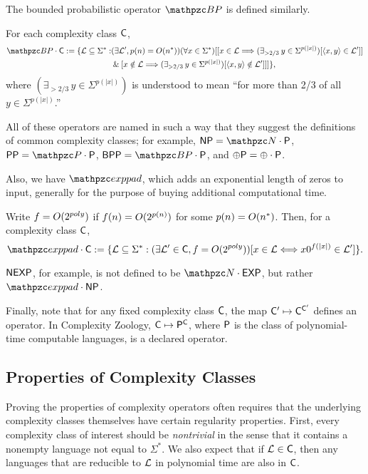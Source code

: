 The bounded probabilistic operator $\cBP$ is defined similarly.
\begin{definition}
For each complexity class $\mathsf{C}$,
\begin{align*}
\cBP\cdot\sC:=\{\cL\subseteq\Sigma^*:&(\exists\cL^\prime,p(n)=\Oh(n^*))(\forall
x\in\Sigma^*)[[x\in\cL\Longrightarrow
(\exists_{>2/3}\hspace{2pt}y\in\Sigma^{p(|x|)})[\inner{x,y}\in\cL^\prime]] \\
&\AND[x\notin\cL\Longrightarrow(\exists_{>2/3}\hspace{2pt}y\in\Sigma^{p(|x|)})
[\inner{x,y}\notin\cL^\prime]]]\},
\end{align*}
where $(\exists_{>2/3}\hspace{2pt}y\in\Sigma^{p(|x|)})$ is understood to
mean ``for more than 2/3 of all $y\in\Sigma^{p(|x|)}$.''
\end{definition}
All of these operators are named in such a way that they suggest the definitions
of common complexity classes; for example, $\NP=\cN\cdot\sP$,
$\sP\sP=\cP\cdot\sP$, $\msf{BPP}=\cBP\cdot\sP$, and $\oplus\mathsf{P}=\oplus\cdot\mathsf{P}$.

Also, we have $\exppad$, which adds an exponential length of
zeros to input, generally for the purpose of buying additional computational
time.
\begin{definition}
Write $f=O(2^{poly})$ if $f(n)=O(2^{p(n)})$ for some $p(n)=O(n^*)$. Then,
for a complexity class $\mathsf{C}$,
\[
\exppad\cdot\sC:=\{\cL\subseteq\Sigma^*:(\exists\cL^\prime\in\sC,f=
\Oh(2^{poly}))[x\in\cL\Longleftrightarrow x0^{f(|x|)}\in\cL^\prime]\}.
\]
\end{definition}
$\mathsf{NEXP}$, for example, is not defined to  be $\cN\cdot\msf{EXP}$, but rather
$\exppad\cdot\NP$.

Finally, note that for any fixed complexity class $\mathsf{C}$, the map 
$\mathsf{C}^\prime\mapsto\mathsf{C}^{\mathsf{C}^\prime}$ defines an operator. In Complexity Zoology, 
$\mathsf{C}\mapsto\mathsf{P}^{\mathsf{C}}$, where $\mathsf{P}$ is the class of polynomial-time computable 
languages, is a declared operator.

\subsection{Properties of Complexity Classes}

Proving the properties of complexity operators often requires that the
underlying complexity classes themselves have certain regularity
properties. First, every complexity class of interest should be
\textit{nontrivial} in the sense that it contains a nonempty language not equal
to $\Sigma^*$. We also expect that if $\mathcal{L}\in\mathsf{C}$, then any languages that are
reducible to $\mathcal{L}$ in polynomial time are also in $\mathsf{C}$.

